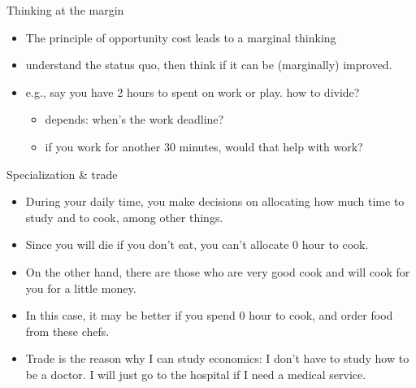 \documentclass[
  ignorenonframetext,
]{beamer}
\begin{document}
\begin{frame}{Thinking at the margin}
\protect\hypertarget{thinking-at-the-margin}{}
\begin{itemize}
\item
  The principle of opportunity cost leads to a marginal thinking
\item
  understand the status quo, then think if it can be (marginally)
  improved.
\item
  e.g., say you have 2 hours to spent on work or play. how to divide?

  \begin{itemize}
  \item
    depends: when's the work deadline?
  \item
    if you work for another 30 minutes, would that help with work?
  \end{itemize}
\end{itemize}
\end{frame}

\begin{frame}{Specialization \& trade}
\protect\hypertarget{specialization-trade}{}
\begin{itemize}
\item
  During your daily time, you make decisions on allocating how much time
  to study and to cook, among other things.
\item
  Since you will die if you don't eat, you can't allocate 0 hour to
  cook.
\item
  On the other hand, there are those who are very good cook and will
  cook for you for a little money.
\item
  In this case, it may be better if you spend 0 hour to cook, and order
  food from these chefs.
\item
  Trade is the reason why I can study economics: I don't have to study
  how to be a doctor. I will just go to the hospital if I need a medical
  service.
\end{itemize}
\end{frame}
\end{document}
